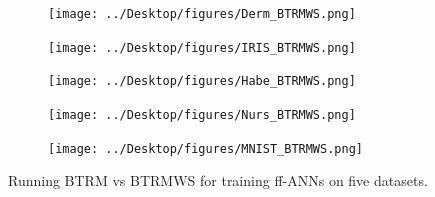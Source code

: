 \documentclass[letterpaper,12pt,titlepage,oneside,final]{book}
\begin{document}
	\begin{figure}
		\centering
		\begin{subfigure}{.45\textwidth}
			\texttt{[image: ../Desktop/figures/Derm\_BTRMWS.png]}
		\end{subfigure}
		\begin{subfigure}{.45\textwidth}
			\texttt{[image: ../Desktop/figures/IRIS\_BTRMWS.png]}
		\end{subfigure}
		\begin{subfigure}{.45\textwidth}
			\texttt{[image: ../Desktop/figures/Habe\_BTRMWS.png]}
		\end{subfigure}
		\begin{subfigure}{.45\textwidth}
			\texttt{[image: ../Desktop/figures/Nurs\_BTRMWS.png]}
		\end{subfigure}
		\begin{subfigure}{.45\textwidth}
			\texttt{[image: ../Desktop/figures/MNIST\_BTRMWS.png]}
		\end{subfigure}
		\caption{Running BTRM vs BTRMWS for training ff-ANNs on five datasets.}
		\label{figure:BTRMWS}
	\end{figure}
	
\end{document}
